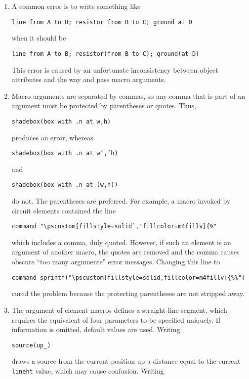 \begin{enumerate}
\item
{}%
  A common error is to write something like

{\tt line from A to B; resistor from B to C; ground at D}

\noindent when it should be

{\tt line from A to B; resistor(from B to C); ground(at D)}

\noindent This error is caused by an unfortunate inconsistency between
\pic object attributes and the way \Mfour and \pic pass macro arguments.

\item 
{}
Macro arguments are separated by commas, so any comma that is
part of an argument must be protected by parentheses or quotes.  Thus,

{\tt shadebox(box with .n at w,h)}

\noindent produces an error, whereas

{\tt shadebox(box with .n at w`,'h)}

\noindent and

{\tt shadebox(box with .n at (w,h))}

\noindent do not. The parentheses are preferred.
For example, a macro invoked by circuit elements contained the line

\verb|command "\pscustom[fillstyle=solid`,'fillcolor=m4fillv]{%"|

\noindent which includes a comma, duly quoted.  However, if such an
element is an argument of another macro, the quotes are removed and the
comma causes obscure ``too many arguments'' error messages.
Changing this line to

\verb|command sprintf("\pscustom[fillstyle=solid,fillcolor=m4fillv]{%%")|

\noindent
cured the problem because the protecting parentheses are not stripped away.

\item 
{}
The \linespec argument of element
macros defines a straight-line segment, which requires
the equivalent of four parameters to be specified uniquely.
If information is omitted, default values are used.  Writing

{\tt source(up\_)}

\noindent draws a source from the current position up a distance equal
to the current {\tt lineht} value, which may cause confusion.
Writing


\end{enumerate}
